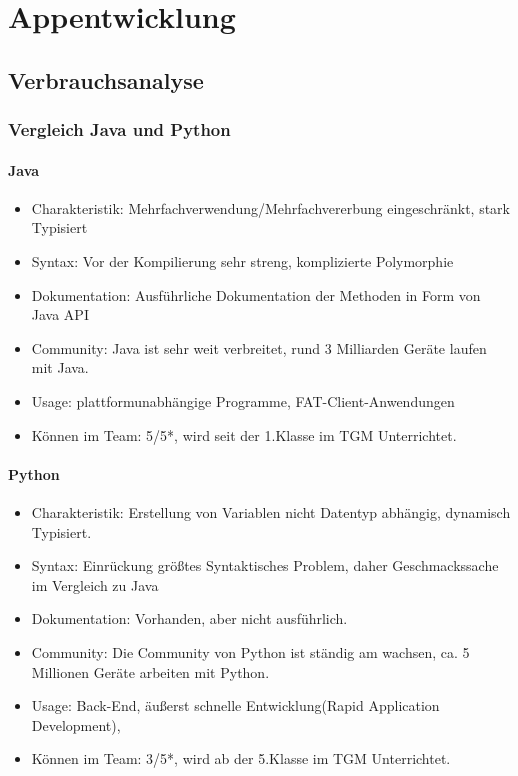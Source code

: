 \chapter{Appentwicklung}

\section{Verbrauchsanalyse}

	\subsection{Vergleich Java und Python}
		\subsubsection{Java}
			\begin{itemize}
				\item Charakteristik: Mehrfachverwendung/Mehrfachvererbung eingeschränkt, stark Typisiert
				\item Syntax: Vor der Kompilierung sehr streng, komplizierte Polymorphie
				\item Dokumentation: Ausführliche Dokumentation der Methoden in Form von Java API
				\item Community: Java ist sehr weit verbreitet, rund 3 Milliarden Geräte laufen mit Java.
				\item Usage: plattformunabhängige Programme, FAT-Client-Anwendungen
				\item Können im Team: 5/5*, wird seit der 1.Klasse im TGM Unterrichtet.
			\end{itemize}

		\subsubsection{Python}
			\begin{itemize}
				\item Charakteristik: Erstellung von Variablen nicht Datentyp abhängig, dynamisch Typisiert.
				\item Syntax: Einrückung größtes Syntaktisches Problem, daher Geschmackssache im Vergleich zu Java
				\item Dokumentation: Vorhanden, aber nicht ausführlich.
				\item Community: Die Community von Python ist ständig am wachsen, ca. 5 Millionen Geräte arbeiten mit Python.
				\item Usage: Back-End, äußerst schnelle Entwicklung(Rapid Application Development),
				\item Können im Team: 3/5*, wird ab der 5.Klasse im TGM Unterrichtet.
			\end{itemize}
			
